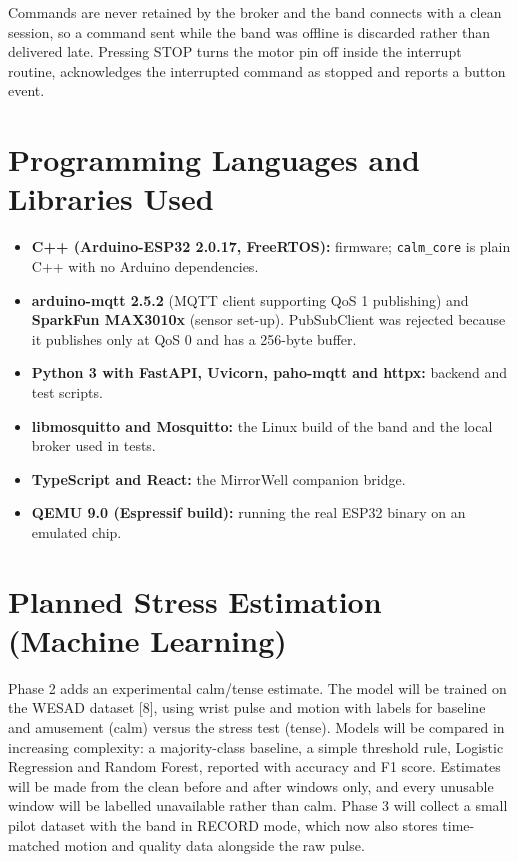 \documentclass[12pt,letterpaper,oneside]{report}
\begin{document}
Commands are never retained by the broker and the band connects with a clean session, so a command sent while the band was offline is discarded rather than delivered late. Pressing STOP turns the motor pin off inside the interrupt routine, acknowledges the interrupted command as stopped and reports a button event.


\section{Programming Languages and Libraries Used}\label{sec:4.5}

\begin{itemize}\item \textbf{C++ (Arduino-ESP32 2.0.17, FreeRTOS):} firmware; \texttt{calm\_\allowbreak{}core} is plain C++ with no Arduino dependencies.
\item \textbf{arduino-mqtt 2.5.2} (MQTT client supporting QoS 1 publishing) and \textbf{SparkFun MAX3010x} (sensor set-up). PubSubClient was rejected because it publishes only at QoS 0 and has a 256-byte buffer.
\item \textbf{Python 3 with FastAPI, Uvicorn, paho-mqtt and httpx:} backend and test scripts.
\item \textbf{libmosquitto and Mosquitto:} the Linux build of the band and the local broker used in tests.
\item \textbf{TypeScript and React:} the MirrorWell companion bridge.
\item \textbf{QEMU 9.0 (Espressif build):} running the real ESP32 binary on an emulated chip.
\end{itemize}

\section{Planned Stress Estimation (Machine Learning)}\label{sec:4.6}

Phase 2 adds an experimental calm/tense estimate. The model will be trained on the WESAD dataset [8], using wrist pulse and motion with labels for baseline and amusement (calm) versus the stress test (tense). Models will be compared in increasing complexity: a majority-class baseline, a simple threshold rule, Logistic Regression and Random Forest, reported with accuracy and F1 score. Estimates will be made from the clean before and after windows only, and every unusable window will be labelled unavailable rather than calm. Phase 3 will collect a small pilot dataset with the band in RECORD mode, which now also stores time-matched motion and quality data alongside the raw pulse.
\end{document}
